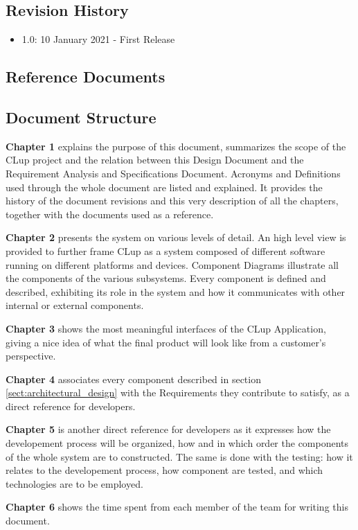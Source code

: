 \subsection{Revision History}

\begin{itemize}
    \item 1.0: 10 January 2021 - First Release
\end{itemize}

\subsection{Reference Documents}


\subsection{Document Structure}

\textbf{Chapter 1} explains the purpose of this document, summarizes the scope of the CLup project and the relation between this Design Document and the Requirement Analysis and Specifications Document.
Acronyms and Definitions used through the whole document are listed and explained.
It provides the history of the document revisions and this very description of all the chapters, together with the documents used as a reference.

\medskip

\textbf{Chapter 2} presents the system on various levels of detail. An high level view is provided to further frame CLup as a system composed of different software running on different platforms and devices. Component Diagrams illustrate all the components of the various subsystems. Every component is defined and described, exhibiting its role in the system and how it communicates with other internal or external components.

\medskip

\textbf{Chapter 3} shows the most meaningful interfaces of the CLup Application, giving a nice idea of what the final product will look like from a customer's perspective.

\medskip


\textbf{Chapter 4} associates every component described in section \ref{sect:architectural_design} with the Requirements they contribute to satisfy, as a direct reference for developers.

\medskip


\textbf{Chapter 5} is another direct reference for developers as it expresses how the developement process will be organized, how and in which order the components of the whole system are to constructed. The same is done with the testing: how it relates to the developement process, how component are tested, and which technologies are to be employed.

\medskip

\textbf{Chapter 6} shows the time spent from each member of the team for writing this document.